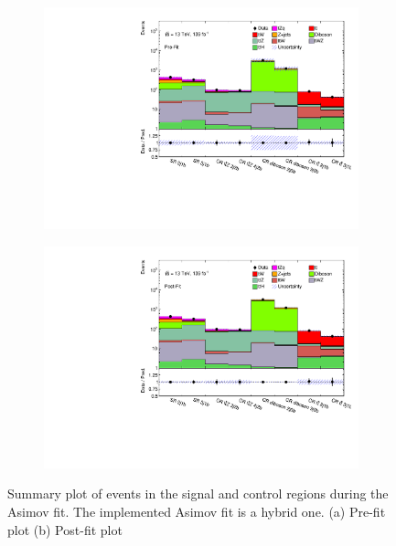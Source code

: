 \begin{figure}[!h] 
  \begin{subfigure}[b]{0.49\linewidth}
    \centering
    \includegraphics[width=\textwidth]{ubonn-thesis/Chapters/Chapters_07/Figure/Asmiov/Summary.pdf}
    \caption{}
  \end{subfigure}%
  \begin{subfigure}[b]{0.49\linewidth}
    \centering
    \includegraphics[width=\textwidth]{ubonn-thesis/Chapters/Chapters_07/Figure/Asmiov/Summary_postFit.pdf}
   \caption{}
  \end{subfigure}
  \caption{Summary plot of events in the signal and control regions during the Asimov fit. The implemented Asimov fit is a hybrid one. (a) Pre-fit plot (b) Post-fit plot }
  \label{fig:summaryplot}
\end{figure}


